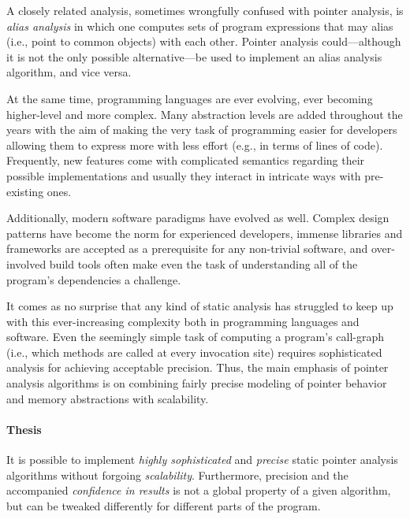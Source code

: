 A closely related analysis, sometimes wrongfully confused with pointer analysis, is \emph{alias analysis} in which one computes sets of program expressions that may alias (i.e., point to common objects) with each other. Pointer analysis could---although it is not the only possible alternative---be used to implement an alias analysis algorithm, and vice versa.

At the same time, programming languages are ever evolving, ever becoming higher-level and more complex. Many abstraction levels are added throughout the years with the aim of making the very task of programming easier for developers allowing them to express more with less effort (e.g., in terms of lines of code). Frequently, new features come with complicated semantics regarding their possible implementations and usually they interact in intricate ways with pre-existing ones.

Additionally, modern software paradigms have evolved as well. Complex design patterns have become the norm for experienced developers, immense libraries and frameworks are accepted as a prerequisite for any non-trivial software, and over-involved build tools often make even the task of understanding all of the program's dependencies a challenge.

It comes as no surprise that any kind of static analysis has struggled to keep up with this ever-increasing complexity both in programming languages and software. Even the seemingly simple task of computing a program's call-graph (i.e., which methods are called at every invocation site) requires sophisticated analysis for achieving acceptable precision. Thus, the main emphasis of pointer analysis algorithms is on combining fairly precise modeling of pointer behavior and memory abstractions with scalability.


\paragraph*{Thesis}
\begin{displayquote}
It is possible to implement \emph{highly sophisticated} and \emph{precise} static pointer analysis algorithms without forgoing \emph{scalability}. Furthermore, precision and the accompanied \emph{confidence in results} is not a global property of a given algorithm, but can be tweaked differently for different parts of the program.
\end{displayquote}

